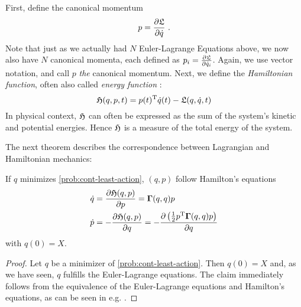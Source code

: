 First, define the canonical momentum
\begin{equation}
	p = \frac{\partial \mathfrak{L}}{\partial \dot{q}} \ .
\end{equation}
Note that just as we actually had $N$ Euler-Lagrange Equations above, we now also have $N$ canonical momenta, each defined as $p_i = \frac{\partial \mathfrak{L}}{\partial \dot{q}_i}$.
Again, we use vector notation, and call $p$ \emph{the} canonical momentum.
Next, we define the \emph{Hamiltonian function}, often also called \emph{energy function} \cite{marsden10}:
\begin{equation}
	\mathfrak{H}(q, p, t) = p(t)^\mathrm{T}\dot{q}(t) - \mathfrak{L}(q, \dot{q}, t)
\end{equation}
In physical context, $\mathfrak{H}$ can often be expressed as the sum of the system's kinetic and potential energies.
Hence $\mathfrak{H}$ is a measure of the total energy of the system.

The next theorem describes the correspondence between Lagrangian and Hamiltonian mechanics:
\begin{theorem}
	If $q$ minimizes \cref{prob:cont-least-action}, $(q, p)$ follow Hamilton's equations
	\begin{equation}
	\label{eq:hamiltonian-system}
		\begin{split}
				\dot{q} &= \frac{\partial \mathfrak{H}(q, p)}{\partial p} = \mathbf{\Gamma}(q, q) p\\
			\dot{p} &= -\frac{\partial \mathfrak{H}(q, p)}{\partial q} 
			= -\frac{\partial \left(\frac{1}{2} p^\mathrm{T} \mathbf{\Gamma}(q, q) p\right)}{\partial q}
		\end{split}
	\end{equation}
	with $q(0) = X$.
\end{theorem}
\begin{proof}
	Let $q$ be a minimizer of \cref{prob:cont-least-action}.
	Then $q(0) = X$ and, as we have seen, $q$ fulfills the Euler-Lagrange equations.
	The claim immediately follows from the equivalence of the Euler-Lagrange equations and Hamilton's equations, as can be seen in e.g. \cite{marsden10, goldstein01}.
\end{proof}


